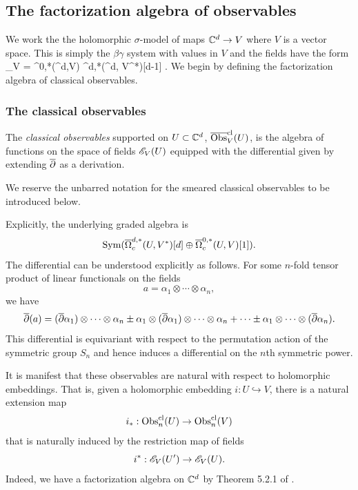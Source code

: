 \subsection{The factorization algebra of observables}

We work the the holomorphic $\sigma$-model of maps $\mathbb C^d \to V$ where $V$ is a vector space.
This is simply the $\beta\gamma$ system with values in $V$ and the fields have the form
\ben
\sE_V = \Omega^{0,*}(\CC^d,V) \oplus \Omega^{d,*}(\CC^d, V^*)[d-1] .
\een
We begin by defining the factorization algebra of classical observables.

\subsubsection{The classical observables}

\begin{dfn}
The \emph{classical observables} supported on $U \subset \mathbb C^d$, $\overline{{\rm Obs}}^{{\rm cl}}_V(U)$, is the algebra of functions on the space of fields $\mathscr E_V(U)$ equipped with the differential given by extending $\overline{\partial}$ as a derivation.
\end{dfn}

\begin{rmk}
We reserve the unbarred notation for the smeared classical observables to be introduced below.
\end{rmk}

Explicitly, the underlying graded algebra is
\[
{\rm Sym}(\overline{\Omega}^{d,*}_c(U,V^*)[d] \oplus \overline{\Omega}^{0,*}_c(U,V)[1]).
\]
The differential can be understood explicitly as follows.
For some $n$-fold tensor product of linear functionals on the fields
\[
a = \alpha_1 \otimes \cdots \otimes \alpha_n,
\]
we have
\[
\overline{\partial}(a) = (\overline{\partial} \alpha_1) \otimes \cdots \otimes \alpha_n \pm \alpha_1 \otimes (\overline{\partial} \alpha_1) \otimes \cdots \otimes \alpha_n + \cdots \pm\alpha_1 \otimes \cdots \otimes (\overline{\partial} \alpha_n).
\]
This differential is equivariant with respect to the permutation action of the symmetric group $S_n$ and 
hence induces a differential on the $n$th symmetric power.

It is manifest that these observables are natural with respect to holomorphic embeddings.
That is, given a holomorphic embedding $i: U \hookrightarrow V$,
there is a natural extension map
\[
i_*: {\rm Obs}^{\rm cl}_n(U) \to {\rm Obs}^{\rm cl}_n(V)
\]
that is naturally induced by the restriction map of fields
\[
i^*: \mathscr E_V(U') \to \mathscr E_V(U).
\]
Indeed, we have a factorization algebra on $\mathbb C^d$ by Theorem 5.2.1 of \cite{CG1}.

